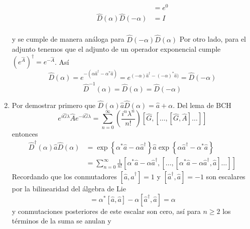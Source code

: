 \begin{enumerate}
\begin{align*}
                                           & = e^{0}                                                                                                                                                                                                                                                \\
          \hat{D}(\alpha) \hat{D}(-\alpha) & = I                                                                                                                                                                                                                                                    \\
        \end{align*}


        y se cumple de manera análoga para $\hat{D}(-\alpha)\hat{D}(\alpha)$
        Por otro lado, para el adjunto tenemos que el adjunto de un operador exponencial cumple $\left(e^{\hat{A}}\right)^{\dagger} = e^{-\hat{A}}$. Así
        \begin{equation*}
          \hat{D}(\alpha) = e^{-(\alpha \hat{a}^{\dagger} - \alpha^{*}\hat{a})} = e^{(-\alpha) \hat{a}^{\dagger} - (-\alpha)^{*}\hat{a})} = \hat{D}(-\alpha)
        \end{equation*}
        \begin{equation*}
          \hat{D}^{-1}(\alpha) = \hat{D}(\alpha) = \hat{D}(-\alpha)
        \end{equation*}
  \item Por demostrar primero que $\hat{D}(\alpha)\hat{a}\hat{D}(\alpha) = \hat{a} + \alpha$. Del lema de BCH \cite{Sakurai}
        \begin{equation*}
          e^{i\hat{G}\lambda}\hat{A}e^{-i\hat{G}\lambda} = \sum_{n=0}^{\infty} \left( \frac{i^n \lambda^n}{n!} \right)[\hat{G},[\dots, [\hat{G},\hat{A}]\dots]]
        \end{equation*}
        entonces
        \begin{align*}
          \hat{D}^{\dagger}(\alpha) \hat{a} \hat{D}(\alpha) & = \exp{\left\{ \alpha^{*}\hat{a} - \alpha \hat{a}^{\dagger} \right\}} \hat{a} \exp{\left\{ \alpha\hat{a}^{\dagger} - \alpha^{*}\hat{a} \right\}}      \\
                                                            & = \sum_{n=0}^{\infty} \frac{1}{n!}[\alpha^{*}\hat{a} -\alpha \hat{a}^{\dagger}, [\dots,[\alpha^{*}\hat{a} - \alpha \hat{a}^{\dagger}, \hat{a}]\dots]]
        \end{align*}
        Recordando que los conmutadores $[\hat{a}, \hat{a}^{\dagger}] = 1$ y $[\hat{a}^{\dagger}, \hat{a}] = -1$ son escalares
        por la bilinearidad del álgebra de Lie
        \begin{equation*}
          [\alpha^{*}\hat{a} - \alpha\hat{a}^{\dagger},\hat{a}] = \alpha^{*}[\hat{a}, \hat{a}] - \alpha[\hat{a}^{\dagger}, \hat{a}] = \alpha
        \end{equation*}
        y conmutaciones posteriores de este escalar son cero, así para $n\geq 2$ los términos de la suma se anulan y


\end{enumerate}
